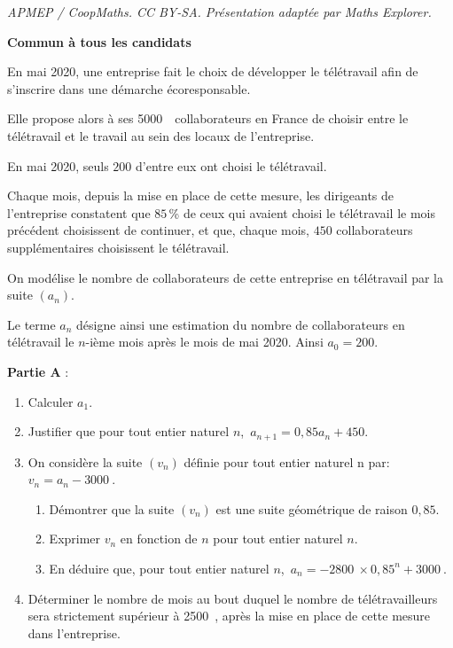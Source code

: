 \documentclass[10pt]{article}
\providecommand{\np}[2][]{{#2~#1}}
\begin{document}
\noindent\textit{APMEP / CoopMaths. CC BY-SA. Présentation adaptée par Maths Explorer.}\par\medskip
\textbf{Commun à tous les candidats}

\medskip

En mai 2020, une entreprise fait le choix de développer le télétravail afin de s'inscrire dans une démarche écoresponsable.

Elle propose alors à ses \np{5000}~collaborateurs en France de choisir entre le télétravail et le travail au sein des locaux de l'entreprise.

En mai 2020, seuls $200$ d'entre eux ont choisi le télétravail.

Chaque mois, depuis la mise en place de cette mesure, les dirigeants de l'entreprise constatent que $85$\,\% de ceux qui avaient choisi le télétravail le mois précédent choisissent de continuer, et que, chaque mois, $450$ collaborateurs supplémentaires choisissent le télétravail.

On modélise le nombre de collaborateurs de cette entreprise en télétravail par la suite $\left(a_n\right)$.

Le terme $a_n$ désigne ainsi une estimation du nombre de collaborateurs en télétravail le $n$-ième mois après le mois de mai 2020. Ainsi $a_0 = 200$.

\bigskip

\textbf{Partie A }:

\medskip

\begin{enumerate}
\item Calculer $a_1$.
\item Justifier que pour tout entier naturel $n$,\,
$a_{n+1} = 0,85a_n + 450$.
\item On considère la suite $\left(v_n\right)$ définie pour tout entier naturel n par: $v_n = a_n - \np{3000}$.
	\begin{enumerate}
		\item Démontrer que la suite $\left(v_n\right)$ est une suite géométrique de raison $0,85$. 
		\item Exprimer $v_n$ en fonction de $n$ pour tout entier naturel $n$.
		\item En déduire que, pour tout entier naturel $n$,\,
$a_n = \np{- 2800} \times  0,85^n + \np{3000}$.
	\end{enumerate}
\item Déterminer le nombre de mois au bout duquel le nombre de télétravailleurs sera strictement supérieur à \np{2500}, après la mise en place de cette mesure dans l'entreprise.
\end{enumerate}
\end{document}
